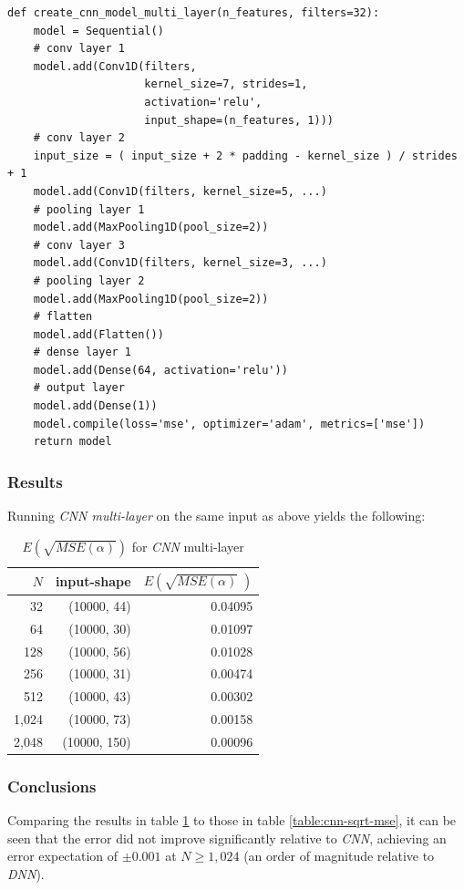 \documentclass[a4paper, 12pt]{report}
\begin{document}
\begin{verbatim}
def create_cnn_model_multi_layer(n_features, filters=32):
    model = Sequential()
    # conv layer 1
    model.add(Conv1D(filters,
                     kernel_size=7, strides=1, 
                     activation='relu', 
                     input_shape=(n_features, 1)))
    # conv layer 2
    input_size = ( input_size + 2 * padding - kernel_size ) / strides  + 1
    model.add(Conv1D(filters, kernel_size=5, ...) 
    # pooling layer 1
    model.add(MaxPooling1D(pool_size=2))
    # conv layer 3
    model.add(Conv1D(filters, kernel_size=3, ...) 
    # pooling layer 2
    model.add(MaxPooling1D(pool_size=2))
    # flatten
    model.add(Flatten())
    # dense layer 1
    model.add(Dense(64, activation='relu'))
    # output layer
    model.add(Dense(1))
    model.compile(loss='mse', optimizer='adam', metrics=['mse'])
    return model
\end{verbatim}

\subsubsection{Results}
Running \textit{CNN multi-layer} on the same input as above yields the following:
\begin{table}[h!]
    \centering
    \begin{tabular}{r r r} 
        $N$ & input-shape & $E\left(\sqrt{MSE(\alpha)}\;\right)$ \\
        \hline
        32 & (10000, 44) & 0.04095 \\ 
        64 & (10000, 30) & 0.01097 \\
        128 & (10000, 56) & 0.01028 \\
        256 & (10000, 31) & 0.00474 \\
        512 & (10000, 43) & 0.00302 \\ 
        \rowcolor{yellow}
        1,024 & (10000, 73) & 0.00158 \\ 
        2,048 & (10000, 150) & 0.00096 \\ 
    \end{tabular}
    \caption{$E\left(\sqrt{MSE(\alpha)}\right)$ for \textit{CNN} multi-layer}
    \label{table:cnn-multi-sqrt-mse}
\end{table}

\subsubsection{Conclusions}
Comparing the results in table \ref{table:cnn-multi-sqrt-mse} to those in table \ref{table:cnn-sqrt-mse}, it can be seen that the error did not improve significantly relative to \textit{CNN}, achieving an error expectation of $\pm 0.001$ at $N \geq 1,024$ (an order of magnitude relative to \textit{DNN}).
\end{document}
